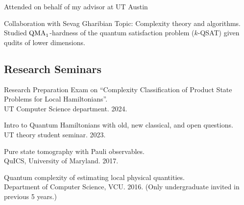 \documentclass[11pt,letterpaper,serif]{moderncv}
\begin{document}
{
	\begin{adjustwidth}{.25in}{}
		Attended on behalf of my advisor at UT Austin
	\end{adjustwidth}
}

{}

{
}

{
	\begin{adjustwidth}{.25in}{}
		Collaboration with Sevag Gharibian \newline
		Topic: Complexity theory and algorithms. Studied $\textup{QMA}_{1}$-hardness of the quantum satisfaction problem ($k$-QSAT) given qudits of lower dimensions.
	\end{adjustwidth}
}




\subsection{Research Seminars}

\setlength{\parskip}{0.5em}

Research Preparation Exam on ``Complexity Classification of Product State Problems for Local Hamiltonians''.
\\ UT Computer Science department. 2024.

Intro to Quantum Hamiltonians with old, new classical, and open questions.
\\UT theory student seminar. 2023.

Pure state tomography with Pauli observables.
\\QuICS, University of Maryland. 2017.

Quantum complexity of estimating local physical quantities.
\\ Department of Computer Science, VCU. 2016.
(Only undergraduate invited in previous 5 years.)

\setlength{\parskip}{0em}


\end{document}
